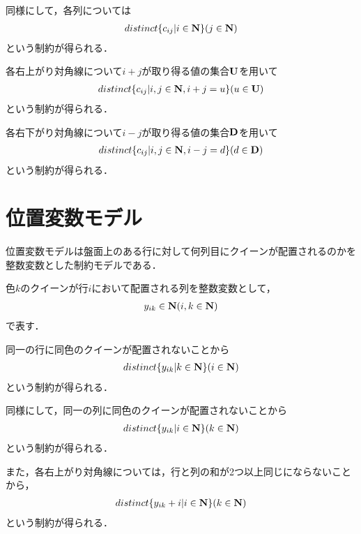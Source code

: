 同様にして，各列については
\begin{eqnarray}
    distinct\{c_{ij} | i \in {\bf N} \} (j \in {\bf N}) \label{eq:bg_col_3}
\end{eqnarray}
という制約が得られる．

各右上がり対角線について$i+j$が取り得る値の集合$\bf U$を用いて
\begin{eqnarray}
    distinct\{c_{ij} | i,j \in {\bf N}, i+j=u \} (u \in {\bf U}) \label{eq:bg_col_4}
\end{eqnarray}
という制約が得られる．

各右下がり対角線について$i-j$が取り得る値の集合$\bf D$を用いて
\begin{eqnarray}
    distinct\{c_{ij} | i,j \in {\bf N}, i-j=d \} (d \in {\bf D}) \label{eq:bg_col_5}
\end{eqnarray}
という制約が得られる．

\section{位置変数モデル}\label{sec:bg_pos}
位置変数モデルは盤面上のある行に対して何列目にクイーンが配置されるのかを整数変数とした制約モデルである．

色$k$のクイーンが行$i$において配置される列を整数変数として，
\begin{eqnarray}
    y_{ik} \in {\bf N} (i,k \in {\bf N}) \label{eq:bg_pos_1}
\end{eqnarray}
で表す．

同一の行に同色のクイーンが配置されないことから
\begin{eqnarray}
    distinct\{y_{ik} | k \in {\bf N} \} (i \in {\bf N}) \label{eq:bg_pos_2}
\end{eqnarray}
という制約が得られる．

同様にして，同一の列に同色のクイーンが配置されないことから
\begin{eqnarray}
    distinct\{y_{ik} | i \in {\bf N} \} (k \in {\bf N}) \label{eq:bg_pos_3}
\end{eqnarray}
という制約が得られる．

また，各右上がり対角線については，行と列の和が2つ以上同じにならないことから，
\begin{eqnarray}
    distinct\{y_{ik}+i | i \in {\bf N} \} (k \in {\bf N}) \label{eq:bg_pos_4}
\end{eqnarray}
という制約が得られる．


